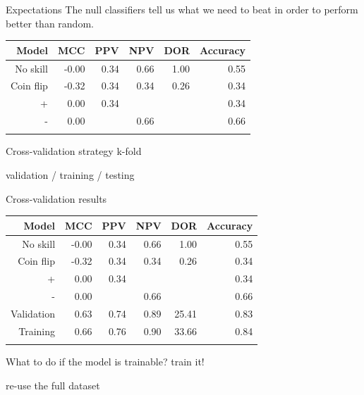 \documentclass[12pt, smalloffset, compress, aspectratio=1610]{beamer}
\begin{document}
\begin{frame}{Expectations}
\label{expectations}
The null classifiers tell us what we need to beat in order to perform
\alert{better than
random}.

\begin{longtable}[]{@{}rrrrrr@{}}
\toprule\noalign{}
\textbf{Model} & \textbf{MCC} & \textbf{PPV} & \textbf{NPV} &
\textbf{DOR} & \textbf{Accuracy} \\
\midrule\noalign{}
\endhead
No skill & -0.00 & 0.34 & 0.66 & 1.00 & 0.55 \\
Coin flip & -0.32 & 0.34 & 0.34 & 0.26 & 0.34 \\
+ & 0.00 & 0.34 & & & 0.34 \\
- & 0.00 & & 0.66 & & 0.66 \\
\bottomrule\noalign{}
\end{longtable}
\end{frame}

\begin{frame}{Cross-validation strategy}
\label{cross-validation-strategy}
k-fold

validation / training / testing
\end{frame}

\begin{frame}{Cross-validation results}
\label{cross-validation-results}
\begin{longtable}[]{@{}rrrrrr@{}}
\toprule\noalign{}
\textbf{Model} & \textbf{MCC} & \textbf{PPV} & \textbf{NPV} &
\textbf{DOR} & \textbf{Accuracy} \\
\midrule\noalign{}
\endhead
No skill & -0.00 & 0.34 & 0.66 & 1.00 & 0.55 \\
Coin flip & -0.32 & 0.34 & 0.34 & 0.26 & 0.34 \\
+ & 0.00 & 0.34 & & & 0.34 \\
- & 0.00 & & 0.66 & & 0.66 \\
Validation & 0.63 & 0.74 & 0.89 & 25.41 & 0.83 \\
Training & 0.66 & 0.76 & 0.90 & 33.66 & 0.84 \\
\bottomrule\noalign{}
\end{longtable}
\end{frame}

\begin{frame}{What to do if the model is trainable?}
\label{what-to-do-if-the-model-is-trainable}
train it!

re-use the full dataset
\end{frame}
\end{document}

